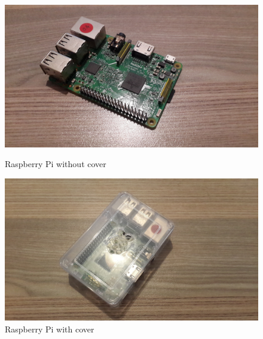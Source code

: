 		
\begin{figure}[ht!]
\centering
\begin{minipage}{.5\textwidth}
  \centering
 \includegraphics[width=0.9\linewidth]{../images/manual/RPi1.jpg}
  \caption{ Raspberry Pi without cover}

\end{minipage}%
\begin{minipage}{.5\textwidth}
  \centering
 \includegraphics[width=0.9\linewidth]{../images/manual/RPi2.jpg}
  \caption{ Raspberry Pi with cover}
\end{minipage}
\end{figure}


